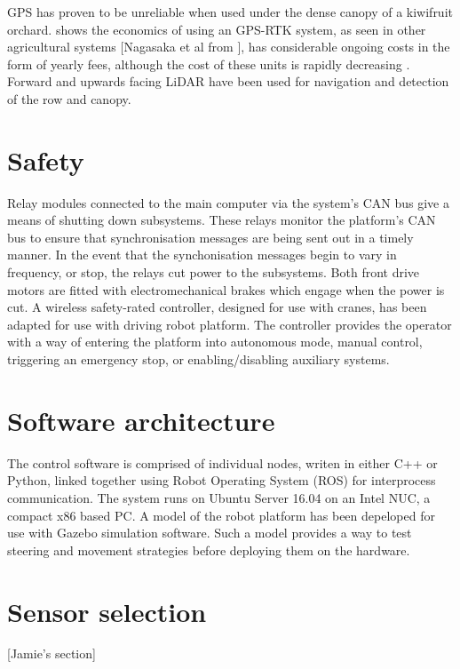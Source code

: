\documentclass[preprint,authoryear,12pt]{elsarticle}
\begin{document}
    GPS has proven to be unreliable when used under the dense canopy of a kiwifruit orchard.
    \citep{Pedersen2006} shows the economics of using an GPS-RTK system, as seen in other agricultural systems \citep{Bak2004,Ruckelshausen2009}[Nagasaka et al from \citep{Torii2000}], has considerable ongoing costs in the form of yearly fees, although the cost of these units is rapidly decreasing \citep{Torii2000}.
    Forward and upwards facing LiDAR have been used for navigation and detection of the row and canopy.

\section{Safety}
\label{sect:safety}
    Relay modules connected to the main computer via the system's CAN bus give a means of shutting down subsystems.
    These relays monitor the platform's CAN bus to ensure that synchronisation messages are being sent out in a timely manner.
    In the event that the synchonisation messages begin to vary in frequency, or stop, the relays cut power to the subsystems.
    Both front drive motors are fitted with electromechanical brakes which engage when the power is cut.
    A wireless safety-rated controller, designed for use with cranes, has been adapted for use with driving robot platform.
    The controller provides the operator with a way of entering the platform into autonomous mode, manual control, triggering an emergency stop, or enabling/disabling auxiliary systems.

\section{Software architecture}
\label{sect:software}
    The control software is comprised of individual nodes, writen in either C++ or Python, linked together using Robot Operating System (ROS) for interprocess communication.
    The system runs on Ubuntu Server 16.04 on an Intel NUC, a compact x86 based PC.
    A model of the robot platform has been depeloped for use with Gazebo simulation software.
    Such a model provides a way to test steering and movement strategies before deploying them on the hardware.

\section{Sensor selection}
\label{sect:sensors}
    [Jamie's section]
\end{document}
